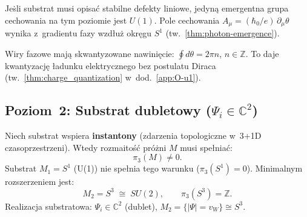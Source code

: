 \begin{corollary}\label{cor:D2-U1-forced}
Je\.sli substrat musi opisa\'c stabilne defekty liniowe,
jedyn\k{a} emergentna grupa cechowania na tym poziomie
jest $U(1)$. Pole cechowania $A_\mu = (\hbar_0/e)\,\partial_\mu\theta$
wynika z~gradientu fazy wzd\l{}u\.z okr\k{e}gu $S^1$
(tw.~\ref{thm:photon-emergence}).
\end{corollary}

\begin{remark}[Kwantyzacja \l{}adunku z~$\pi_1 = \mathbb{Z}$]%
\label{rem:D2-charge-quant}
Wiry fazowe maj\k{a} skwantyzowane nawinięcie:
$\oint d\theta = 2\pi n$, $n \in \mathbb{Z}$.
To daje kwantyzacj\k{e} \l{}adunku elektrycznego
bez postulatu Diraca (tw.~\ref{thm:charge_quantization}
w~dod.~\ref{app:O-u1}).
\end{remark}

\subsection{Poziom~2: Substrat dubletowy ($\Psi_i \in \mathbb{C}^2$)}%
\label{ssec:D2-level2}

\begin{theorem}%
\label{thm:D2-instanton-necessary}

Niech substrat wspiera \textbf{instantony} (zdarzenia topologiczne
w~3+1D czasoprzestrzeni). Wtedy rozmaito\'s\'c pr\'o\.zni
$M$ musi spe\l{}nia\'c:
\begin{equation}\label{eq:D2-pi3-required}
  \pi_3(M) \neq 0.
\end{equation}
Substrat $M_1 = S^1$ (U(1)) nie spe\l{}nia tego warunku
($\pi_3(S^1) = 0$). Minimalnym rozszerzeniem jest:
\begin{equation}\label{eq:D2-M2}
  M_2 = S^3 \;\cong\; SU(2),
  \qquad
  \pi_3(S^3) = \mathbb{Z}.
\end{equation}
Realizacja substratowa: $\Psi_i \in \mathbb{C}^2$ (dublet),
$M_2 = \{|\Psi| = v_W\} \cong S^3$.
\end{theorem}

